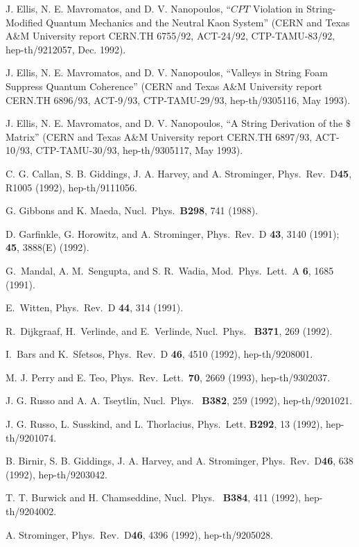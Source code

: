 \begin{thebibliography}{999}
 J. Ellis, N. E. Mavromatos, and D. V. Nanopoulos,
``$CPT$ Violation in String-Modified
Quantum Mechanics and the Neutral Kaon System''
(CERN and Texas A\&M University report CERN.TH 6755/92, ACT-24/92,
CTP-TAMU-83/92, hep-th/9212057, Dec. 1992).

 J. Ellis, N. E. Mavromatos, and D. V. Nanopoulos,
``Valleys in String Foam Suppress Quantum Coherence''
(CERN and Texas A\&M University report CERN.TH 6896/93, ACT-9/93,
CTP-TAMU-29/93, hep-th/9305116, May 1993).

 J. Ellis, N. E. Mavromatos, and D. V. Nanopoulos,
``A String Derivation of the $\$$ Matrix''
(CERN and Texas A\&M University report CERN.TH 6897/93, ACT-10/93,
CTP-TAMU-30/93, hep-th/9305117, May 1993).

 C. G. Callan, S. B. Giddings, J. A. Harvey, and A.
Strominger,
Phys.\ Rev.\ D{\bf 45}, R1005 (1992), hep-th/9111056.

 G. Gibbons and K. Maeda, Nucl.\ Phys.\ {\bf B298},
741 (1988).

 D. Garfinkle, G. Horowitz, and A. Strominger, Phys.\
Rev.\ D{\bf
43}, 3140 (1991); {\bf 45}, 3888(E) (1992).

 G.~Mandal, A. M.~Sengupta, and S. R.~Wadia,
Mod.~Phys.~Lett.~A
{\bf 6}, 1685 (1991).

 E.~Witten, Phys.~Rev.~D {\bf  44}, 314 (1991).

 R.~Dijkgraaf, H.~Verlinde, and E.~Verlinde,
Nucl.~Phys.~{\bf
B371}, 269 (1992).

 I.~Bars and K.~Sfetsos, Phys.~Rev.~D {\bf  46}, 4510
(1992),
hep-th/9208001.

 M. J. Perry and E. Teo, Phys.\ Rev.\ Lett.\ {\bf 70},
2669
(1993),
hep-th/9302037.

 J. G. Russo and A. A. Tseytlin, Nucl.\ Phys.\ {\bf
B382},
259 (1992), hep-th/9201021.

 J. G. Russo, L. Susskind, and L. Thorlacius, Phys.\
Lett. {\bf
B292}, 13 (1992), hep-th/9201074.

 B. Birnir, S. B. Giddings, J. A. Harvey, and A.
Strominger,
Phys.\ Rev.\ D{\bf 46}, 638 (1992), hep-th/9203042.

 T. T. Burwick and H. Chamseddine, Nucl.\ Phys.\ {\bf
B384},
411 (1992), hep-th/9204002.

 A. Strominger, Phys.\ Rev.\ D{\bf 46}, 4396 (1992),
hep-th/9205028.


\end{thebibliography}
